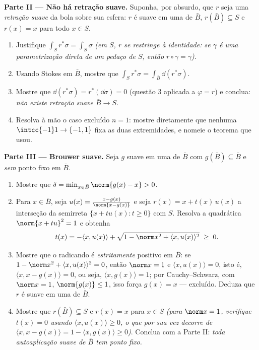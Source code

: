 \begin{problem}
\medskip
\noindent\textbf{Parte II --- Não há retração suave.} Suponha, por
absurdo, que $r$ seja uma \emph{retração suave} da bola sobre sua
esfera: $r$ é suave em uma  de $\bar B$, $r(\bar B) \subseteq S$ e $r(x) = x$
para todo $x \in S$.
\begin{enumerate}[resume]
  \item Justifique $\int_Sr^*\sigma = \int_S\sigma$ \emph{(em $S$, $r$ se restringe à
        identidade: se $\gamma$ é uma parametrização direta de um
        pedaço de $S$, então $r\circ\gamma = \gamma$)}.
  \item Usando Stokes em $\bar B$, mostre que $\int_Sr^*\sigma =
        \int_{\bar B}\dd(r^*\sigma)$.
  \item Mostre que $\dd(r^*\sigma) = r^*(\dd\sigma) = 0$ (questão 3 aplicada a $\varphi = r$) e conclua:
        \emph{não existe retração suave $\bar B \to S$.}
  \item Resolva à mão o caso excluído $n = 1$: mostre diretamente
        que nenhuma  $\intcc{-1}1 \to
        \{-1, 1\}$ fixa as duas extremidades, e
        nomeie o teorema que usou.
\end{enumerate}

\medskip
\noindent\textbf{Parte III --- Brouwer suave.} Seja $g$ suave em uma
 de $\bar B$ com $g(\bar B)
\subseteq \bar B$ e \emph{sem} ponto fixo em
$\bar B$.
\begin{enumerate}[resume]
  \item Mostre que $\delta = \min_{x\in\bar B}\norm{g(x) - x} >
        0$.
  \item Para $x \in \bar B$, seja $u(x) = \frac{x -
        g(x)}{\norm{x - g(x)}}$ e seja $r(x) = x +
        t(x)\,u(x)$ a interseção da semirreta
        $\{x + tu(x) : t \geq 0\}$ com $S$. Resolva a quadrática $\norm{x + tu}^2 = 1$ e obtenha
        \[
        t(x) = -\langle x, u(x)\rangle +
        \sqrt{1 - \norm x^2 + \langle x, u(x)\rangle^2}
        \;\geq\; 0 .
        \]
  \item Mostre que o radicando é \emph{estritamente} positivo em
        $\bar B$: se $1 - \norm x^2 + \langle x,
        u(x)\rangle^2 = 0$, então $\norm x = 1$ e $\langle
        x, u(x)\rangle = 0$, isto é, $\langle x, x -
        g(x)\rangle = 0$, ou
        seja, $\langle x, g(x)\rangle =
        1$; por Cauchy--Schwarz, com $\norm x = 1$, $\norm{g(x)} \leq 1$, isso força
        $g(x) = x$ --- excluído. Deduza que $r$ é suave em uma 
        de $\bar B$.
  \item Mostre que $r(\bar B) \subseteq S$ e $r(x) = x$ para $x
        \in S$ \emph{(para $\norm x = 1$, verifique
        $t(x) = 0$ usando $\langle x, u(x)\rangle \geq 0$, o que por sua vez decorre de $\langle x, x - g(x)\rangle = 1 -
        \langle x, g(x)\rangle \geq 0$)}. Conclua
        com a Parte II: \emph{toda autoaplicação suave de $\bar B$
        tem ponto fixo.}
\end{enumerate}


\end{problem}
